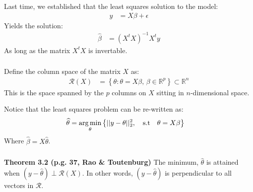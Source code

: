 \begin{frame}[fragile] \frametitle{}

Last time, we established that the least squares solution to the
model:
\begin{align*}
y &= X\beta + \epsilon
\end{align*}
Yields the solution:
\begin{align*}
\widehat{\beta} &= (X^t X)^{-1} X^t y
\end{align*}
As long as the matrix $X^t X$ is invertable.

\end{frame}

\begin{frame}[fragile] \frametitle{}

Define the column space of the matrix $X$ as:
\begin{align*}
\mathcal{R} (X) &= \left\{ \theta : \theta = X \beta, \, \beta \in \mathbb{R}^p \right\} \subset \mathbb{R}^n
\end{align*}
This is the space spanned by the $p$ columns on $X$ sitting in $n$-dimensional space.

\pause Notice that the least squares problem can be re-written as:
\begin{align*}
\widehat{\theta} &= \mathop{\mathrm{arg\,min}}_\theta \left\{ || y - \theta||_2^2, \quad \text{s.t} \quad \theta = X\beta \right\}
\end{align*}
Where $\widehat{\beta} = X \widehat{\theta}$.

\end{frame}

\begin{frame}[fragile] \frametitle{}

{\bf Theorem 3.2 (p.g. 37, Rao \& Toutenburg)} The minimum, $\widehat{\theta}$ is
attained when $(y - \widehat{\theta}) \perp \mathcal{R}(X)$.
In other words, $(y - \widehat{\theta})$ is perpendicular to all vectors
in $\mathcal{R}$.

\end{frame}

